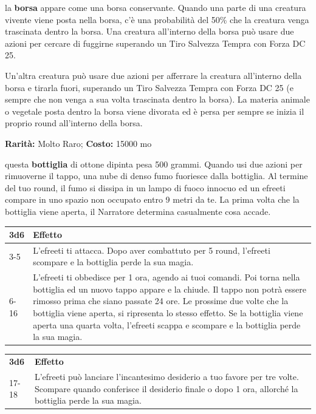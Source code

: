 \begin{multicols}{2}
la \textbf{borsa} appare come una borsa conservante. Quando una parte di una creatura vivente viene posta nella borsa, c'è una probabilità del 50\% che la creatura venga trascinata dentro la borsa. Una creatura all'interno della borsa può usare due azioni per cercare di fuggirne superando un Tiro Salvezza Tempra con Forza DC 25.

Un'altra creatura può usare due azioni per afferrare la creatura all'interno della borsa e tirarla fuori, superando un Tiro Salvezza Tempra con Forza DC 25 (e sempre che non venga a sua volta trascinata dentro la borsa). La materia animale o vegetale posta dentro la borsa viene divorata ed è persa per sempre se inizia il proprio round all'interno della borsa.


\textbf{Rarità:} Molto Raro; \textbf{Costo:} 15000 mo

questa \textbf{bottiglia} di ottone dipinta pesa 500 grammi. Quando usi due azioni per rimuoverne il tappo, una nube di denso fumo fuoriesce dalla bottiglia. Al termine del tuo round, il fumo si dissipa in un lampo di fuoco innocuo ed un efreeti compare in uno spazio non occupato entro 9 metri da te. La prima volta che la bottiglia viene aperta, il Narratore determina casualmente cosa accade.

\medskip

\noindent\begin{tabularx}{\linewidth}{lX}
	\toprule
\rowcolor{gray!20}\textbf{3d6} &\textbf{Effetto}\\
\toprule
3-5 & L'efreeti ti attacca. Dopo aver combattuto per 5 round, l'efreeti scompare e la bottiglia perde la sua magia.\\
\rowcolor{gray!20}6-16 &L'efreeti ti obbedisce per 1 ora, agendo ai tuoi comandi. Poi torna nella bottiglia ed un nuovo tappo appare e la chiude. Il tappo non potrà essere rimosso prima che siano passate 24 ore. Le prossime due volte che la bottiglia viene aperta, si ripresenta lo stesso effetto. Se la bottiglia viene aperta una quarta volta, l'efreeti scappa e scompare e la bottiglia perde la sua magia.\\
\end{tabularx}
\noindent\begin{tabularx}{\linewidth}{lX}
\rowcolor{gray!20}\textbf{3d6} &\textbf{Effetto}\\

17-18 & L'efreeti può lanciare l'incantesimo desiderio a tuo favore per tre volte. Scompare quando conferisce il desiderio finale o dopo 1 ora, allorché la bottiglia perde la sua magia.
\end{tabularx}


\end{multicols}
